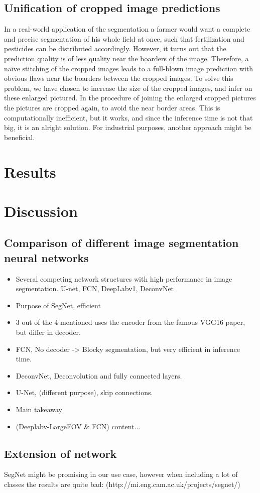 \documentclass[12pt,fleqn]{article}
\begin{document}
\subsection{Unification of cropped image predictions}
In a real-world application of the segmentation a farmer would want a complete and precise segmentation of his whole field at once, such that fertilization and pesticides can be distributed accordingly. However, it turns out that the prediction quality is of less quality near the boarders of the image. Therefore, a naïve stitching of the cropped images leads to a full-blown image prediction with obvious flaws near the boarders between the cropped images. To solve this problem, we have chosen to increase the size of the cropped images, and infer on these enlarged pictured. In the procedure of joining the enlarged cropped pictures the pictures are cropped again, to avoid the near border areas. This is computationally inefficient, but it works, and since the inference time is not that big, it is an alright solution. For industrial purposes, another approach might be beneficial.


\section{Results}



\section{Discussion}
\subsection{Comparison of different image segmentation neural networks}
\begin{itemize}
	\item Several competing network structures with high performance in image segmentation. U-net, FCN, DeepLabv1, DeconvNet
	\item Purpose of SegNet, efficient
	\item 3 out of the 4 mentioned uses the encoder from the famous VGG16 paper, but differ in decoder.
	\item FCN, No decoder -> Blocky segmentation, but very efficient in inference time.
	\item DeconvNet, Deconvolution and fully connected layers. 
	\item U-Net, (different purpose), skip connections. 
	\item Main takeaway  
	\item (Deeplabv-LargeFOV \& FCN)
	content...
\end{itemize}

\subsection{Extension of network}
SegNet might be promising in our use case, however when including a lot of classes the results are quite bad: (http://mi.eng.cam.ac.uk/projects/segnet/) 
\end{document}
